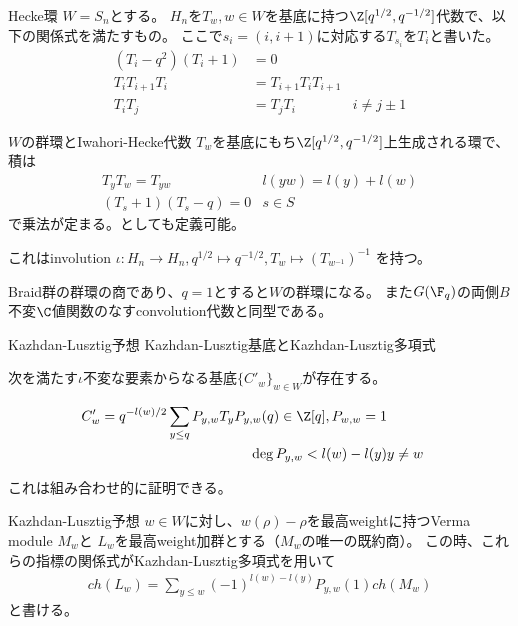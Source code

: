 \documentclass[dvipdfmx]{beamer}
\begin{document}
\begin{frame}{Hecke環}
$W=S_n$とする。
$H_n$を$T_w, w\in W$を基底に持つ$\Z[q^{1/2},q^{-1/2}]$代数で、以下の関係式を満たすもの。
ここで$s_i=(i, i+1)$に対応する$T_{s_i}$を$T_i$と書いた。
\begin{align*}
(T_i-q^2)(T_i+1)&=0\\
T_iT_{i+1}T_i&=T_{i+1}T_iT_{i+1}\\
T_iT_j&=T_jT_i&i\neq j\pm1
\end{align*}

$W$の群環とIwahori-Hecke代数
$T_w$を基底にもち$\Z[q^{1/2}, q^{-1/2}]$上生成される環で、積は
\begin{align*}
T_yT_w=T_{yw}& l(yw)=l(y)+l(w)\\
(T_s+1)(T_s-q)=0 & s\in S
\end{align*}
で乗法が定まる。としても定義可能。

これはinvolution $\iota:H_n \to H_n, q^{1/2} \mapsto q^{-1/2}, T_w\mapsto(T_{w^{-1}})^{-1}$
を持つ。

Braid群の群環の商であり、$q=1$とすると$W$の群環になる。
また$G(\F_q)$の両側$B$不変$\C$値関数のなすconvolution代数と同型である。
\end{frame}

\begin{frame}{Kazhdan-Lusztig予想}
Kazhdan-Lusztig基底とKazhdan-Lusztig多項式
\begin{prop}
次を満たす$\iota$不変な要素からなる基底$\{C'_w\}_{w\in W}$が存在する。

\begin{align*}
C'_w=q^{-l(w)/2}\sum_{y\leq q}P_{y,w}T_y
P_{y,w}(q)\in\Z[q], P_{w,w}=1\\
\deg P_{y,w}<l(w)-l(y)&y\neq w
\end{align*}
\end{prop}
これは組み合わせ的に証明できる。


Kazhdan-Lusztig予想
$w\in W$に対し、$w(\rho)-\rho$を最高weightに持つVerma module $M_w$と
$L_w$を最高weight加群とする（$M_w$の唯一の既約商）。
この時、これらの指標の関係式がKazhdan-Lusztig多項式を用いて
\begin{align*}
ch(L_w)=\sum_{y\leq w}(-1)^{l(w)-l(y)}P_{y,w}(1)ch(M_w)
\end{align*}
と書ける。
\end{frame}
\end{document}
